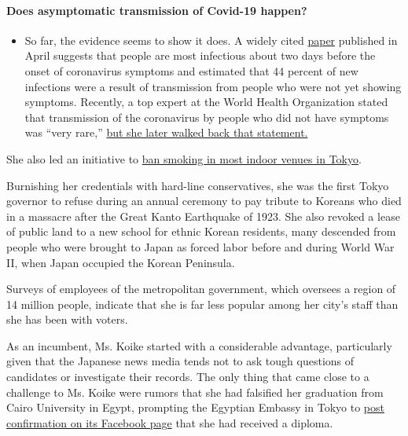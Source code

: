 \begin{itemize}
{  \paragraph{Does asymptomatic transmission of Covid-19
  happen?}\label{does-asymptomatic-transmission-of-covid-19-happen}}

  \begin{itemize}
  \tightlist
  \item
    So far, the evidence seems to show it does. A widely cited
    \href{https://www.nature.com/articles/s41591-020-0869-5}{paper}
    published in April suggests that people are most infectious about
    two days before the onset of coronavirus symptoms and estimated that
    44 percent of new infections were a result of transmission from
    people who were not yet showing symptoms. Recently, a top expert at
    the World Health Organization stated that transmission of the
    coronavirus by people who did not have symptoms was ``very rare,''
    \href{https://www.nytimes3xbfgragh.onion/2020/06/09/world/coronavirus-updates.html?action=click\&pgtype=Article\&state=default\&region=MAIN_CONTENT_3\&context=storylines_faq\#link-1f302e21}{but
    she later walked back that statement.}
  \end{itemize}
\end{itemize}

She also led an initiative to
\href{https://www.nytimes3xbfgragh.onion/2017/11/27/world/asia/japan-tokyo-smoking.html}{ban
smoking in most indoor venues in Tokyo}.

Burnishing her credentials with hard-line conservatives, she was the
first Tokyo governor to refuse during an annual ceremony to pay tribute
to Koreans who died in a massacre after the Great Kanto Earthquake of
1923. She also revoked a lease of public land to a new school for ethnic
Korean residents, many descended from people who were brought to Japan
as forced labor before and during World War II, when Japan occupied the
Korean Peninsula.

Surveys of employees of the metropolitan government, which oversees a
region of 14 million people, indicate that she is far less popular among
her city's staff than she has been with voters.

As an incumbent, Ms. Koike started with a considerable advantage,
particularly given that the Japanese news media tends not to ask tough
questions of candidates or investigate their records. The only thing
that came close to a challenge to Ms. Koike were rumors that she had
falsified her graduation from Cairo University in Egypt, prompting the
Egyptian Embassy in Tokyo to
\href{https://www.facebookcorewwwi.onion/permalink.php?story_fbid=1103403096719497\&id=520203215039491}{post
confirmation on its Facebook page} that she had received a diploma.

